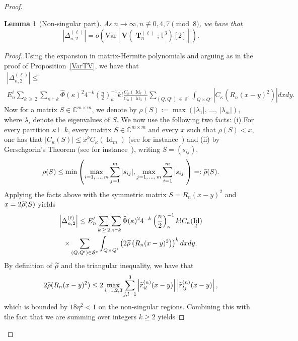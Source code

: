 \documentclass[10pt]{amsart}
\newtheorem{lemm}[theo]{Lemma}\newtheorem{prop}[theo]{Proposition}\newtheorem{coro}[theo]{Corollary}\newtheorem{conj}[theo]{Conjecture}
\theoremstyle{definition}\newtheorem{defi}[theo]{Definition}\newtheorem{rema}[theo]{Remark}\newtheorem{exam}[theo]{Example}\newtheorem{exem}[theo]{Example}\newtheorem{nota}[theo]{Notation}
\DeclareMathOperator{\Id}{Id}
\DeclareMathOperator{\bT}{\mathbf{T}}
\newcommand{\bfv}{\mathbf{V}}
\newcommand{\clS}{\mathcal{S}}
\newcommand{\C}{\mathbb{C}}
\newcommand{\T}{\mathbb{T}^3}
\newcommand{\V}[1]{\mathrm{Var}{\left[#1\right]}}
\newcommand{\notcon}[3]{ {#1} \not\equiv {#2} \pmod {#3} }
\let\oldtilde\tilde
\renewcommand*{\tilde}[1]{\mathchoice{\widetilde{#1}}{\widetilde{#1}}{\oldtilde{#1}}{\oldtilde{#1}}}
\begin{document}
\begin{proof}
\begin{lemm}[Non-singular part]\label{NonSingLemma}
As $n \to \infty, \notcon{n}{0,4,7}{8}$, we have that
\[
\left| \Delta_{n,2}^{(\ell)}\right| = o\left(\V{\bfv\left(\bT_n^{(\ell)};\T\right)[2]}\right).
\]
\end{lemm}
\begin{proof}
Using the expansion in matrix-Hermite polynomials and arguing as in the proof of Proposition~\ref{VarTV}, we have that
\begin{multline*}
\left| \Delta_{n,2}^{(\ell)}\right|
\leq\\
E_n^{\ell}
\sum_{k\,\geq\,2}
\sum_{\kappa \vdash k}
\widehat{\Phi}(\kappa)^2 4^{-k}
\left(\frac{n}{2}\right)^{-1}_{\kappa} k!
\frac{C_{\kappa}(\Id_{\ell})}{C_{\kappa}(\Id_3)}
\sum_{(Q,Q')\,\in\,\clS^c}
\int_{Q\times Q'}
\left| C_{\kappa}\left(R_n(x-y)^2\right) \right| dxdy.
\end{multline*}
Now for a matrix $S \in \C^{m\times m}$, we denote by $\rho(S):=\max(|\lambda_1|,\,\ldots,\,|\lambda_m|)$, where $\lambda_i$ denote the eigenvalues of $S$. We now use the following two facts: (i) For every partition $\kappa\vdash k$, every matrix $S \in \C^{m\times m}$ and every $x$ such that $\rho(S) < x$, one has that $\left|C_{\kappa}(S)\right| \leq x^k C_{\kappa}(\Id_m)$ (see for instance~\cite[p.~197]{BFZP}) and (ii) by Gerschgorin's Theorem (see for instance~\cite[p.~1084]{GR:14}), writing $S=(s_{ij})$,
\[
\rho(S) \leq \min\left(
\max_{i=1,\,\ldots,\,m} \sum_{j=1}^m |s_{ij}|,
\max_{j=1,\,\ldots,\,m}
\sum_{i=1}^m |s_{ij}|
\right)=: \tilde{\rho}(S).
\]
Applying the facts above with the symmetric matrix $S= R_n(x-y)^2$ and $x = 2\tilde{\rho}(S)$ yields
\begin{multline}\label{BoundB1}
\left| \Delta_{n,2}^{(\ell)}\right| \leq E_n^{\ell}
\sum_{k\,\geq\,2}
\sum_{\kappa \vdash k}
\widehat{\Phi}(\kappa)^2 4^{-k}
\left(\frac{n}{2}\right)^{-1}_{\kappa} k! C_{\kappa}(\Id_{\ell})\\
\times \sum_{(Q,Q')\in \clS^c}
\int_{Q\times Q'}
\left(2 \tilde{\rho}\left(R_n(x-y)^2\right) \right)^{k} dxdy.
\end{multline}
By definition of $\tilde{\rho}$ and the triangular inequality, we have that
\begin{equation}\label{tilderho}
2\tilde{\rho}(R_n(x-y)^2)
\leq 2\max_{i=1,2,3}
\sum_{j,l=1}^3
\left| \tilde{r}^{(n)}_{il}(x-y)\right|
\left| \tilde{r}^{(n)}_{lj}(x-y)\right|,
\end{equation}
which is bounded by $18\eta^2<1$ on the non-singular regions. Combining this with the fact that we are summing over integers $k\geq 2$ yields

\end{proof}
\end{proof}
\end{document}
